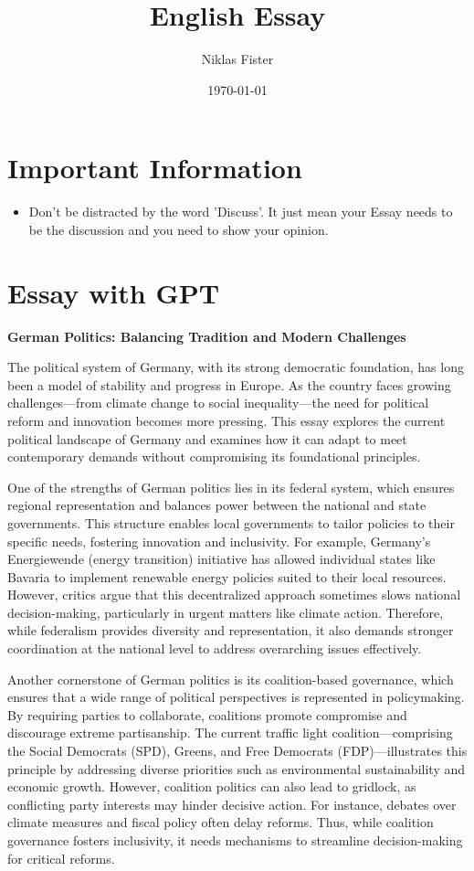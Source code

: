 \documentclass{article}
\title{\Huge\textbf{English Essay}}
\author{Niklas Fister}
\date{\today}
\begin{document}
\maketitle
\newpage

\section{Important Information}
\begin{itemize}[parsep=0pt]
    \item Don't be distracted by the word 'Discuss'. It just mean your Essay needs to be the discussion and you need to show your opinion.
\end{itemize}
\newpage

\section{Essay with GPT}
\textbf{German Politics: Balancing Tradition and Modern Challenges}

The political system of Germany, with its strong democratic foundation, has long been a model of stability and progress in Europe. As the country faces growing challenges—from climate change to social inequality—the need for political reform and innovation becomes more pressing. This essay explores the current political landscape of Germany and examines how it can adapt to meet contemporary demands without compromising its foundational principles.

One of the strengths of German politics lies in its federal system, which ensures regional representation and balances power between the national and state governments. This structure enables local governments to tailor policies to their specific needs, fostering innovation and inclusivity. For example, Germany’s Energiewende (energy transition) initiative has allowed individual states like Bavaria to implement renewable energy policies suited to their local resources. However, critics argue that this decentralized approach sometimes slows national decision-making, particularly in urgent matters like climate action. Therefore, while federalism provides diversity and representation, it also demands stronger coordination at the national level to address overarching issues effectively.

Another cornerstone of German politics is its coalition-based governance, which ensures that a wide range of political perspectives is represented in policymaking. By requiring parties to collaborate, coalitions promote compromise and discourage extreme partisanship. The current traffic light coalition—comprising the Social Democrats (SPD), Greens, and Free Democrats (FDP)—illustrates this principle by addressing diverse priorities such as environmental sustainability and economic growth. However, coalition politics can also lead to gridlock, as conflicting party interests may hinder decisive action. For instance, debates over climate measures and fiscal policy often delay reforms. Thus, while coalition governance fosters inclusivity, it needs mechanisms to streamline decision-making for critical reforms.
\end{document}
